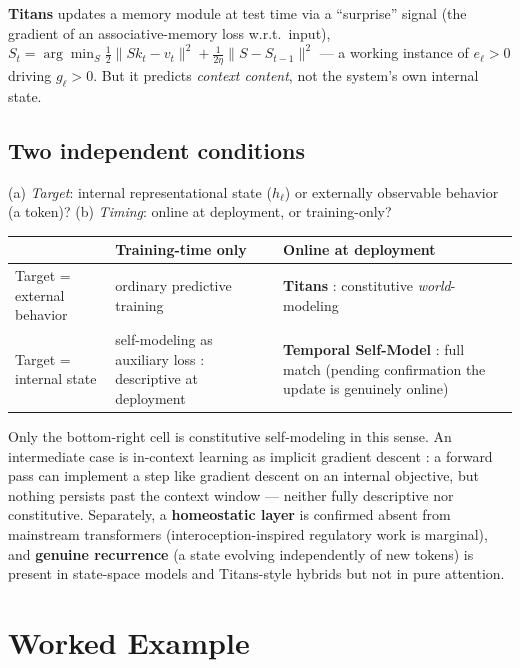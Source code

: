 \documentclass[11pt]{article}
\begin{document}
\textbf{Titans} \cite{behrouz2024} updates a memory module at test time via a ``surprise'' signal (the gradient of an associative-memory loss w.r.t.\ input), $S_t=\arg\min_S\frac12\|Sk_t-v_t\|^2+\frac1{2\eta}\|S-S_{t-1}\|^2$ --- a working instance of $e_\ell>0$ driving $g_\ell>0$. But it predicts \emph{context content}, not the system's own internal state.

\subsection*{Two independent conditions}
(a) \emph{Target}: internal representational state ($h_\ell$) or externally observable behavior (a token)? (b) \emph{Timing}: online at deployment, or training-only?

\begin{center}
\small
\begin{tabular}{@{}>{\raggedright}p{2.6cm}>{\raggedright}p{4.5cm}>{\raggedright\arraybackslash}p{4.5cm}@{}}
\toprule
 & \textbf{Training-time only} & \textbf{Online at deployment} \\
\midrule
Target = external behavior & ordinary predictive training & \textbf{Titans} \cite{behrouz2024}: constitutive \emph{world}-modeling \\[4pt]
Target = internal state & self-modeling as auxiliary loss \cite{premakumar2026}: descriptive at deployment & \textbf{Temporal Self-Model} \cite{tsm2026}: full match (pending confirmation the update is genuinely online) \\
\bottomrule
\end{tabular}
\end{center}
Only the bottom-right cell is constitutive self-modeling in this sense. An intermediate case is in-context learning as implicit gradient descent \cite{oswald2023}: a forward pass can implement a step like gradient descent on an internal objective, but nothing persists past the context window --- neither fully descriptive nor constitutive. Separately, a \textbf{homeostatic layer} is confirmed absent from mainstream transformers (interoception-inspired regulatory work \cite{interoceptive2026} is marginal), and \textbf{genuine recurrence} (a state evolving independently of new tokens) is present in state-space models and Titans-style hybrids but not in pure attention.

\section{Worked Example}\label{sec:example}
\end{document}
